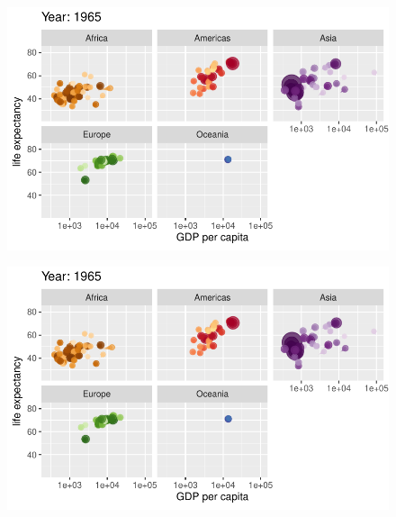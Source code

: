 \documentclass[
  letterpaper,
  DIV=11,
  numbers=noendperiod]{scrartcl}
\begin{document}
\begin{figure}[H]

{\centering \includegraphics{class05_files/figure-pdf/unnamed-chunk-24-24.pdf}

}

\end{figure}

\begin{figure}[H]

{\centering \includegraphics{class05_files/figure-pdf/unnamed-chunk-24-25.pdf}

}

\end{figure}
\end{document}
